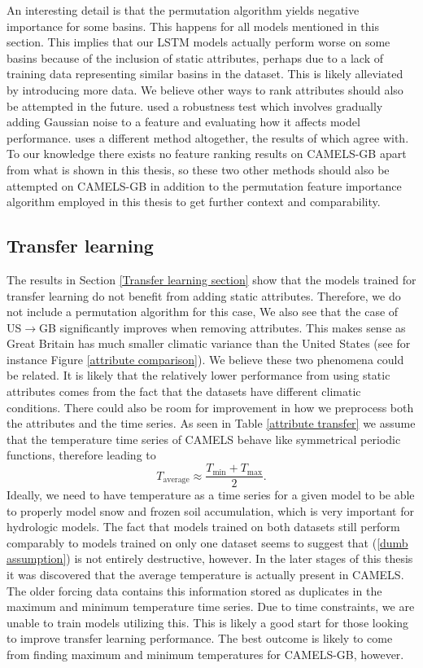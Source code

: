 An interesting detail is that the permutation algorithm yields negative importance 
for some basins. This happens for all models mentioned in this section. 
This implies that our LSTM models actually perform worse 
on some basins because of the inclusion of static attributes, perhaps due to a 
lack of training data representing similar basins in the dataset. This is likely 
alleviated by introducing more data. We believe other ways to rank attributes 
should also be attempted 
in the future. \citet{lstm_second_paper} used a robustness test which 
involves gradually adding Gaussian noise to a feature and evaluating how it 
affects model performance. \citet{OrigCAMELSRanking} 
uses a different method altogether, the results of which \cite{lstm_second_paper} 
agree with. To our knowledge there exists no feature ranking results on CAMELS-GB 
apart from what is shown in this thesis, 
so these two other methods should also be attempted on CAMELS-GB in addition 
to the permutation feature importance algorithm employed in this thesis to get further context and comparability.

\subsection{Transfer learning}
The results in Section \ref{Transfer learning section} show that the models trained 
for transfer learning do not benefit from adding static attributes. Therefore, we 
do not include a permutation algorithm for this case, We also see 
that the case of US$\rightarrow$GB significantly improves when removing attributes. This makes 
sense as Great Britain has much smaller climatic variance than the United States 
(see for instance Figure \ref{attribute comparison}). We believe these two phenomena could be related. It is likely 
that the relatively lower performance from using static attributes comes from the 
fact that the datasets have different climatic conditions. There could also be 
room for improvement in how we preprocess both the attributes and the time series. 
As seen in Table \ref{attribute transfer} we assume that the temperature time series 
of CAMELS behave like symmetrical periodic functions, therefore leading to 
\begin{equation}
T_\text{average} \approx  \frac{T_\text{min}+T_\text{max}}{2}. \label{dumb assumption}
\end{equation}
Ideally, we need to have temperature as a time series for a given model to be able 
to properly model snow and frozen soil accumulation, which is very important for 
hydrologic models. The fact that models trained on both datasets 
still perform comparably to models trained on only one dataset seems to suggest 
that (\ref{dumb assumption}) is not entirely destructive, however.
In the later stages of this thesis it was discovered that the average temperature 
is actually present in CAMELS. The older forcing data \citep{maurer} contains 
this information stored as duplicates in the maximum and minimum temperature time 
series. Due to time constraints, we are unable to train models utilizing this. 
This is likely a good start for those looking to improve transfer learning 
performance. 
The best outcome is likely to come from finding maximum and minimum temperatures 
for CAMELS-GB, however.

